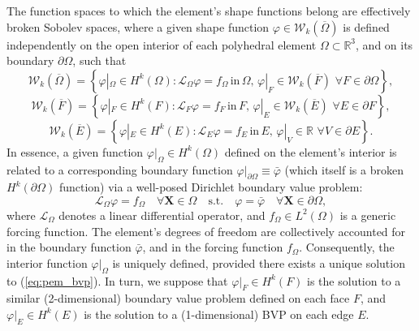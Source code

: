 	The function spaces to which the element's shape functions belong are effectively broken Sobolev spaces, where a given shape function $\varphi \in \mathcal{W}_k (\overline{\Omega})$ is defined independently on the open interior of each polyhedral element $\Omega \subset \mathbb{R}^3$, and on its boundary $\partial \Omega$, such that
	\begin{equation}
		\mathcal{W}_k (\overline{\Omega}) = \left\{ \varphi|_{\Omega} \in H^k (\Omega) : \mathcal{L}_{\Omega} \varphi = f_{\Omega} \, \text{in} \, \Omega, \, \varphi|_{F} \in \mathcal{W}_k (\overline{F}) \, \, \forall F \in \partial \Omega \right\},
	\end{equation}
	\begin{equation}
		\mathcal{W}_k (\overline{F}) = \left\{ \varphi|_{F} \in H^k (F) : \mathcal{L}_{F} \varphi = f_{F} \, \text{in} \, F, \, \varphi|_{E} \in \mathcal{W}_k (\overline{E}) \, \, \forall E \in \partial F \right\},
	\end{equation}
	\begin{equation}
		\mathcal{W}_k (\overline{E}) = \left\{ \varphi|_{E} \in H^k (E) : \mathcal{L}_{E} \varphi = f_{E} \, \text{in} \, E, \, \varphi|_{V} \in \mathbb{R} \, \, \forall V \in \partial E \right\}.
	\end{equation}
	In essence, a given function $\varphi|_{\Omega} \in H^k (\Omega)$ defined on the element's interior is related to a corresponding boundary function $\varphi|_{\partial \Omega} \equiv \bar{\varphi}$ (which itself is a broken $H^k (\partial \Omega)$ function) via a well-posed Dirichlet boundary value problem:
	\begin{equation}
		\mathcal{L}_{\Omega} \varphi = f_{\Omega} \quad \forall \mathbf{X} \in \Omega \quad \text{s.t.} \quad \varphi = \bar{\varphi} \quad \forall \mathbf{X} \in \partial \Omega,
		\label{eq:pem_bvp}
	\end{equation}
	where $\mathcal{L}_{\Omega}$ denotes a linear differential operator, and $f_{\Omega} \in L^2 (\Omega)$ is a generic forcing function. The element's degrees of freedom are collectively accounted for in the boundary function $\bar{\varphi}$, and in the forcing function $f_{\Omega}$. Consequently, the interior function $\varphi|_{\Omega}$ is uniquely defined, provided there exists a unique solution to (\ref{eq:pem_bvp}). In turn, we suppose that $\varphi|_{F} \in H^k(F)$ is the solution to a similar (2-dimensional) boundary value problem defined on each face $F$, and $\varphi|_E \in H^k(E)$ is the solution to a (1-dimensional) BVP on each edge $E$.
	
